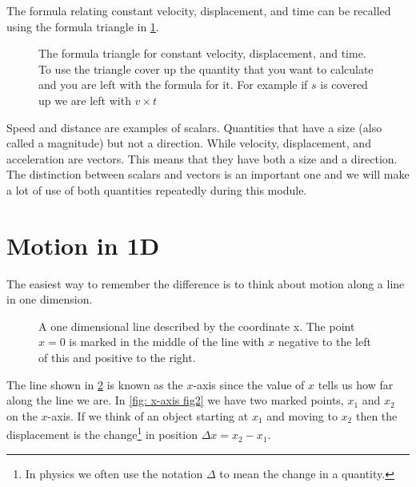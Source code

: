 The formula relating constant velocity, displacement, and time can be recalled using the formula triangle in \cref{fig: vst triangle}.\\

\begin{figure}[ht]
    \centering
  {\displaymathother
   \Huge {}
   }
    \caption{The formula triangle for constant velocity, displacement, and time. To use the triangle cover up the quantity that you want to calculate and you are left with the formula for it. For example if $s$ is covered up we are left with $v\times t$}
    \label{fig: vst triangle}
\end{figure}


Speed and distance are examples of scalars. Quantities that have a size (also called a magnitude) but not a direction. While velocity, displacement, and acceleration are vectors. This means that they have both a size and a direction.\\

The distinction between scalars and vectors is an important one and we will make a lot of use of both quantities repeatedly during this module.



\section{Motion in 1D}
The easiest way to remember the difference is to think about motion along a line in one dimension.\\

\begin{figure}[ht]
    \centering
    \caption{A one dimensional line described by the coordinate x. The point $x=0$ is marked in the middle of the line with $x$ negative to the left of this and positive to the right.}
    \label{fig: x-axis fig}
\end{figure}

The line shown in \cref{fig: x-axis fig} is known as the $x$-axis since the value of $x$ tells us how far along the line we are. In \cref{fig: x-axis fig2} we have two marked points, $x_{1}$ and $x_{2}$ on the $x$-axis. If we think of an object starting at $x_{1}$ and moving to $x_{2}$ then the displacement is the change\footnote{In physics we often use the notation $\Delta$ to mean the change in a quantity.} in position $\Delta x =x_{2}-x_{1}$.\\

